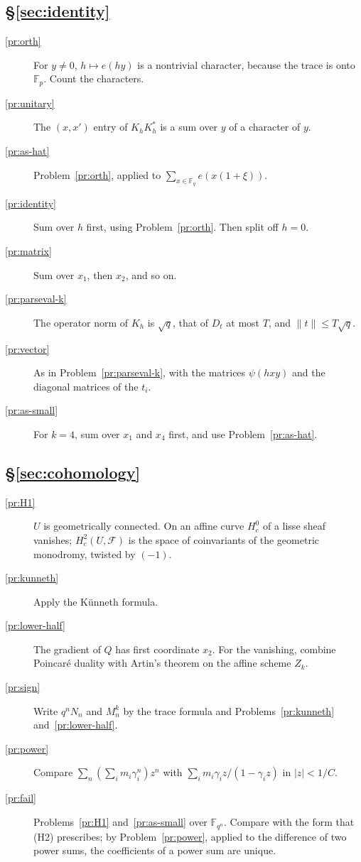 \documentclass[reqno]{amsart}
\theoremstyle{definition}
\theoremstyle{plain}
\newcommand{\F}{\mathbb{F}}
\newcommand{\cF}{\mathcal{F}}
\newcommand{\e}{e}
\begin{document}
\subsection*{\S\ref{sec:identity}}
\begin{description}
\item[\ref{pr:orth}] For \(y \ne 0\), \(h \mapsto \e(hy)\) is a nontrivial character, because the trace is onto \(\F_p\).  Count the characters.
\item[\ref{pr:unitary}] The \((x,x')\) entry of \(K_hK_h^*\) is a sum over \(y\) of a character of \(y\).
\item[\ref{pr:as-hat}] Problem~\ref{pr:orth}, applied to \(\sum_{x \in \F_q} \e(x(1 + \xi))\).
\item[\ref{pr:identity}] Sum over \(h\) first, using Problem~\ref{pr:orth}.  Then split off \(h = 0\).
\item[\ref{pr:matrix}] Sum over \(x_1\), then \(x_2\), and so on.
\item[\ref{pr:parseval-k}] The operator norm of \(K_h\) is \(\sqrt q\), that of \(D_t\) at most \(T\), and \(\lVert t \rVert \le T\sqrt q\).
\item[\ref{pr:vector}] As in Problem~\ref{pr:parseval-k}, with the matrices \(\psi(hxy)\) and the diagonal matrices of the \(t_i\).
\item[\ref{pr:as-small}] For \(k = 4\), sum over \(x_1\) and \(x_4\) first, and use Problem~\ref{pr:as-hat}.
\end{description}

\subsection*{\S\ref{sec:cohomology}}
\begin{description}
\item[\ref{pr:H1}] \(U\) is geometrically connected.  On an affine curve \(H^0_c\) of a lisse sheaf vanishes; \(H^2_c(U, \cF)\) is the space of coinvariants of the geometric monodromy, twisted by \((-1)\).
\item[\ref{pr:kunneth}] Apply the K\"unneth formula.
\item[\ref{pr:lower-half}] The gradient of \(Q\) has first coordinate \(x_2\).  For the vanishing, combine Poincar\'e duality with Artin's theorem on the affine scheme \(Z_k\).
\item[\ref{pr:sign}] Write \(q^nN_n\) and \(M_n^k\) by the trace formula and Problems~\ref{pr:kunneth} and~\ref{pr:lower-half}.
\item[\ref{pr:power}] Compare \(\sum_n (\sum_i m_i \gamma_i^n) z^n\) with \(\sum_i m_i\gamma_i z/(1 - \gamma_i z)\) in \(\lvert z \rvert < 1/C\).
\item[\ref{pr:fail}] Problems~\ref{pr:H1} and~\ref{pr:as-small} over \(\F_{q^n}\).  Compare with the form that (H2) prescribes; by Problem~\ref{pr:power}, applied to the difference of two power sums, the coefficients of a power sum are unique.
\end{description}
\end{document}
